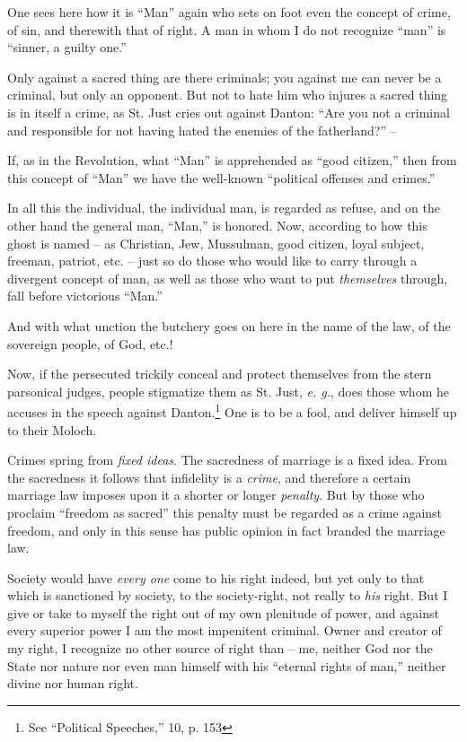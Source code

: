 \documentclass[12pt,a4paper]{book}
\begin{document}
One sees here how it is ``Man'' again who sets on foot even the concept of 
crime, of sin, and therewith that of right. A man in whom I do not recognize 
``man'' is ``sinner, a guilty one.''

Only against a sacred thing are there criminals; you against me can never be a 
criminal, but only an opponent. But not to hate him who injures a sacred thing 
is in itself a crime, as St. Just cries out against Danton: ``Are you not a 
criminal and responsible for not having hated the enemies of the 
fatherland?'' --

If, as in the Revolution, what ``Man'' is apprehended as ``good citizen,'' 
then from this concept of ``Man'' we have the well-known ``political 
offenses and crimes.''

In all this the individual, the individual man, is regarded as refuse, and on 
the other hand the general man, ``Man,'' is honored. Now, according to how 
this ghost is named -- as Christian, Jew, Mussulman, good citizen, loyal 
subject, freeman, patriot, etc. -- just so do those who would like to carry 
through a divergent concept of man, as well as those who want to put 
\textit{themselves} through, fall before victorious ``Man.''

And with what unction the butchery goes on here in the name of the law, of the 
sovereign people, of God, etc.!

Now, if the persecuted trickily conceal and protect themselves from the stern 
parsonical judges, people stigmatize them as St. Just, \textit{e. g.}, does 
those whom he accuses in the speech against Danton.\footnote{See ``Political 
Speeches,'' 10, p. 153} One is to be a fool, and deliver himself up to their 
Moloch.

Crimes spring from \textit{fixed ideas}. The sacredness of marriage is a fixed 
idea. From the sacredness it follows that infidelity is a \textit{crime}, and 
therefore a certain marriage law imposes upon it a shorter or longer 
\textit{penalty}. But by those who proclaim ``freedom as sacred'' this 
penalty must be regarded as a crime against freedom, and only in this sense 
has public opinion in fact branded the marriage law.

Society would have \textit{every one} come to his right indeed, but yet only 
to that which is sanctioned by society, to the society-right, not really to 
\textit{his} right. But I give or take to myself the right out of my own 
plenitude of power, and against every superior power I am the most impenitent 
criminal. Owner and creator of my right, I recognize no other source of right 
than -- me, neither God nor the State nor nature nor even man himself with his 
``eternal rights of man,'' neither divine nor human right.
\end{document}
